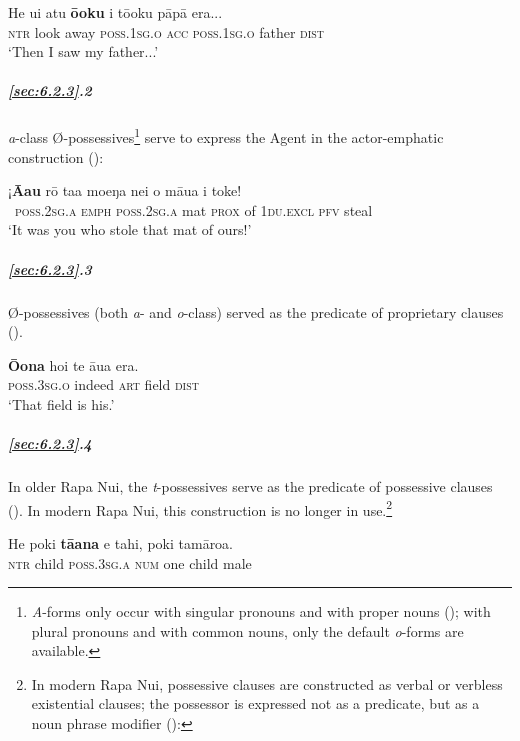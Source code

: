 \ea\label{ex:6.27}
\gll He u{\ꞌ}i atu \textbf{ō{\ꞌ}oku} i tō{\ꞌ}oku pāpā era...\\
\textsc{ntr} look away \textsc{poss.1sg.o} \textsc{acc} \textsc{poss.1sg.o} father \textsc{dist}\\

\glt 
‘Then I saw my father...’ \textstyleExampleref{[R101.012]} 
\z

\subparagraph{\ref{sec:6.2.3}.2} \textit{a}{}-class Ø-possessives\footnote{\label{fn:288}\textit{A}-forms only occur with singular pronouns and with proper nouns (); with plural pronouns and with common nouns, only the default \textit{o}{}-forms are available.} serve to express the Agent in the actor-emphatic construction ():

\ea\label{ex:6.28}
\gll ¡\textbf{{\ꞌ}Ā{\ꞌ}au} rō ta{\ꞌ}a moeŋa nei o māua i toke! \\
~\textsc{poss.2sg.a} \textsc{emph} \textsc{poss.2sg.a} mat \textsc{prox} of \textsc{1du.excl} \textsc{pfv} steal \\

\glt 
‘It was you who stole that mat of ours!’ \textstyleExampleref{[R310.428]} 
\z

\subparagraph{\ref{sec:6.2.3}.3} Ø-possessives (both \textit{a}{}- and \textit{o}{}-class) served as the predicate of proprietary clauses ().

\ea\label{ex:6.29}
\gll \textbf{Ō{\ꞌ}ona} ho{\ꞌ}i te {\ꞌ}āua era. \\
\textsc{poss.3sg.o} indeed \textsc{art} field \textsc{dist} \\

\glt 
‘That field is his.’ \textstyleExampleref{[R413.228]} 
\z

\subparagraph{\ref{sec:6.2.3}.4} In older Rapa Nui, the \textit{t}{}-possessives serve as the predicate of possessive clauses (). In modern Rapa Nui, this construction is no longer in use.\footnote{\label{fn:289}In modern Rapa Nui, possessive clauses are constructed as verbal or verbless existential clauses; the possessor is expressed not as a predicate, but as a noun phrase modifier ():}

\ea\label{ex:6.30}
\gll He poki \textbf{tā{\ꞌ}ana} e tahi, poki tamāroa. \\
\textsc{ntr} child \textsc{poss.3sg.a} \textsc{num} one child male \\

